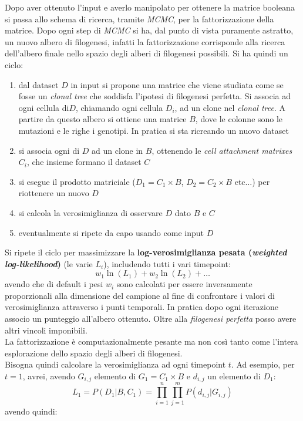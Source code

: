 \documentclass[a4paper,12pt, oneside]{book}
\begin{document}
Dopo aver ottenuto l'input e averlo manipolato per ottenere la matrice booleana
si passa allo schema di ricerca, tramite \textit{MCMC}, per la fattorizzazione
della matrice. Dopo ogni step di \textit{MCMC} si ha, dal punto di vista
puramente astratto, un nuovo albero di filogenesi, infatti la fattorizzazione
corrisponde alla ricerca dell'albero finale nello spazio degli alberi di
filogenesi possibili. Si ha quindi un ciclo:
\begin{enumerate}
  \item dal dataset $D$ in input si propone una matrice che viene studiata come
  se fosse un \textit{clonal tree} che soddisfa l'ipotesi di filogenesi
  perfetta. Si associa ad ogni cellula di$D$, chiamando ogni cellula
  $D_i$, ad un clone nel \textit{clonal tree}. A partire da questo albero si
  ottiene una matrice $B$, dove le colonne sono le mutazioni e le righe i
  genotipi. In pratica si sta ricreando un nuovo dataset
  \item si associa ogni di $D$ ad un clone in $B$, ottenendo le \textit{cell
    attachment matrixes} $C_i$, che insieme formano il dataset $C$
  \item si esegue il prodotto matriciale ($D_1=C_1\times B$, $D_2=C_2\times B$
  etc$\ldots$) per riottenere un nuovo $D$ 
  \item si calcola la verosimiglianza di osservare $D$ dato $B$ e $C$
  \item eventualmente si ripete da capo usando come input $D$
\end{enumerate}
Si ripete il ciclo per massimizzare la \textbf{log-verosimiglianza pesata
  (\textit{weighted log-likelihood})} (le varie $L_i$), includendo tutti i vari
timepoint: \[w_1\ln(L_1)+w_2\ln(L_2)+\ldots\]
avendo che di default i pesi $w_i$ sono calcolati per essere inversamente
proporzionali alla dimensione del campione al fine di confrontare i valori di
verosimiglianza attraverso i punti temporali. In pratica dopo ogni iterazione
associo un punteggio all'albero ottenuto. Oltre alla \textit{filogenesi
  perfetta} posso avere altri vincoli imponibili.\\
La fattorizzazione è computazionalmente pesante ma non così tanto come l'intera
esplorazione dello spazio degli alberi di filogenesi.\\
Bisogna quindi calcolare la verosimiglianza ad ogni timepoint $t$. Ad esempio,
per $t=1$, avrei, avendo $G_{i,j}$ elemento di $G_1=C_1\times B$ e $d_{i,j}$ un
elemento di $D_1$: 
\[L_1=P(D_1|B,C_1)=\prod_{i=1}^n\prod_{j=1}^mP(d_{i,j}|G_{i,j})\]
avendo quindi:
\end{document}
